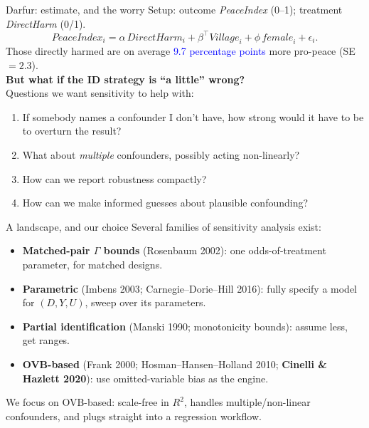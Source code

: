 \documentclass[xcolor=dvipsnames]{beamer}
\begin{document}
\begin{frame}{Darfur: estimate, and the worry}
\small
{} Setup: outcome \textit{PeaceIndex} (0--1); treatment \textit{DirectHarm} (0/1).
\[
\mathit{PeaceIndex}_i = \alpha\,\mathit{DirectHarm}_i + \beta^\top \mathit{Village}_i + \phi\, \mathit{female}_i + \epsilon_i.
\]
 Those directly harmed are on average \textcolor{Blue}{9.7 percentage points} more pro-peace (SE $=2.3$).\\
\medskip
{} \textbf{But what if the ID strategy is ``a little'' wrong?}\\
\medskip
{} Questions we want sensitivity to help with:
\begin{enumerate}
\item<5-> If somebody names a confounder I don't have, how strong would it have to be to overturn the result?
\item<6-> What about \emph{multiple} confounders, possibly acting non-linearly?
\item<7-> How can we report robustness compactly?
\item<8-> How can we make informed guesses about plausible confounding?
\end{enumerate}
\end{frame}


\begin{frame}{A landscape, and our choice}
 Several families of sensitivity analysis exist:
\small
\begin{itemize}
\item<2-> \textbf{Matched-pair $\Gamma$ bounds} (Rosenbaum 2002): one odds-of-treatment parameter, for matched designs.
\smallskip
\item<3-> \textbf{Parametric} (Imbens 2003; Carnegie--Dorie--Hill 2016): fully specify a model for $(D, Y, U)$, sweep over its parameters.
\smallskip
\item<4-> \textbf{Partial identification} (Manski 1990; monotonicity bounds): assume less, get ranges.
\smallskip
\item<5-> \textbf{OVB-based} (Frank 2000; Hosman--Hansen--Holland 2010; \textbf{Cinelli \& Hazlett 2020}): use omitted-variable bias as the engine.
\end{itemize}
\bigskip
{} We focus on OVB-based: scale-free in $R^2$, handles multiple/non-linear confounders, and plugs straight into a regression workflow.
\end{frame}


\end{document}
